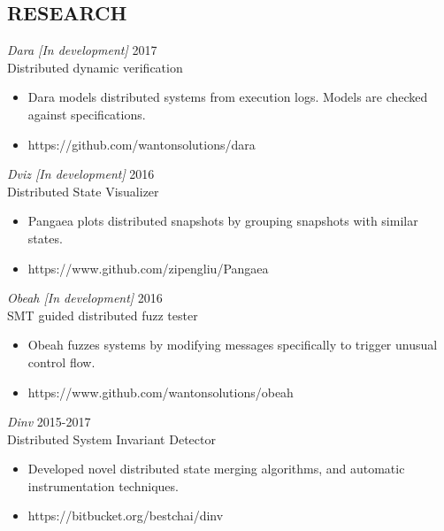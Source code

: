 \documentclass[line,margin]{res}
\begin{document}
\address{3549 Puget Drive, Vancouver, BC }
\address{(604) 970-2469}
\address{sgrant09@cs.ubc.ca}
\address{https://wantonsolutions.github.io/}
\begin{resume}

\section{RESEARCH}

{\sl Dara [In development]} \hfill 2017\\
    Distributed dynamic verification
\begin{itemize} \itemsep -2pt
        \item Dara models distributed systems from execution logs. Models are checked against specifications.
        \item https://github.com/wantonsolutions/dara
\end{itemize}

{\sl Dviz [In development]} \hfill 2016\\
    Distributed State Visualizer
\begin{itemize} \itemsep -2pt
        \item Pangaea plots distributed snapshots by grouping snapshots with similar states.
        \item https://www.github.com/zipengliu/Pangaea
\end{itemize}

    {\sl Obeah [In development]} \hfill 2016\\
    SMT guided distributed fuzz tester
\begin{itemize} \itemsep -2pt
        \item Obeah fuzzes systems by modifying messages specifically to trigger unusual control flow.
        \item https://www.github.com/wantonsolutions/obeah
\end{itemize}

{\sl Dinv} \hfill 2015-2017\\
    Distributed System Invariant Detector
\begin{itemize} \itemsep -2pt
        \item Developed novel distributed state merging algorithms, and automatic instrumentation techniques.
        \item https://bitbucket.org/bestchai/dinv
\end{itemize}


\end{resume}
\end{document}
